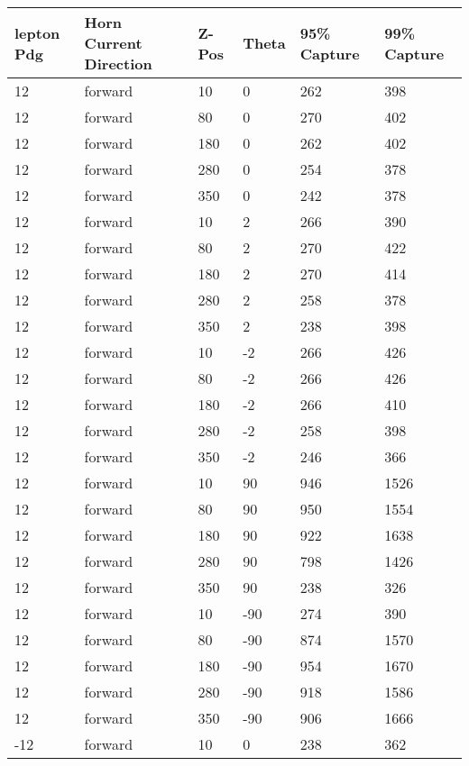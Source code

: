 \begin{longtable}{|l|l|l|l|l|l|}
			\hline
			lepton Pdg & Horn Current Direction & Z-Pos & Theta & 95\% Capture & 99\% Capture \\
			\hline
			12 & forward & 10 & 0 & 262 & 398 \\
			\hline
			12 & forward & 80 & 0 & 270 & 402 \\
			\hline
			12 & forward & 180 & 0 & 262 & 402 \\
			\hline
			12 & forward & 280 & 0 & 254 & 378 \\
			\hline
			12 & forward & 350 & 0 & 242 & 378 \\
			\hline
			12 & forward & 10 & 2 & 266 & 390 \\
			\hline
			12 & forward & 80 & 2 & 270 & 422 \\
			\hline
			12 & forward & 180 & 2 & 270 & 414 \\
			\hline
			12 & forward & 280 & 2 & 258 & 378 \\
			\hline
			12 & forward & 350 & 2 & 238 & 398 \\
			\hline
			12 & forward & 10 & -2 & 266 & 426 \\
			\hline
			12 & forward & 80 & -2 & 266 & 426 \\
			\hline
			12 & forward & 180 & -2 & 266 & 410 \\
			\hline
			12 & forward & 280 & -2 & 258 & 398 \\
			\hline
			12 & forward & 350 & -2 & 246 & 366 \\
			\hline
			12 & forward & 10 & 90 & 946 & 1526 \\
			\hline
			12 & forward & 80 & 90 & 950 & 1554 \\
			\hline
			12 & forward & 180 & 90 & 922 & 1638 \\
			\hline
			12 & forward & 280 & 90 & 798 & 1426 \\
			\hline
			12 & forward & 350 & 90 & 238 & 326 \\
			\hline
			12 & forward & 10 & -90 & 274 & 390 \\
			\hline
			12 & forward & 80 & -90 & 874 & 1570 \\
			\hline
			12 & forward & 180 & -90 & 954 & 1670 \\
			\hline
			12 & forward & 280 & -90 & 918 & 1586 \\
			\hline
			12 & forward & 350 & -90 & 906 & 1666 \\
			\hline
			-12 & forward & 10 & 0 & 238 & 362 \\
			\hline

\end{longtable}
